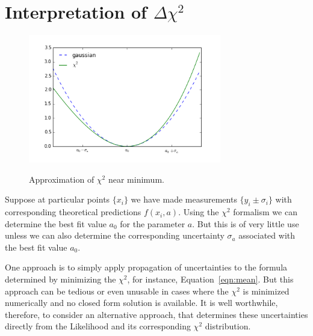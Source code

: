 \documentclass[12pt,oneside]{book}
\begin{document}
\section{Interpretation of $\Delta \chi^2$}

\begin{figure}[htbp]
\begin{center}
{\includegraphics[width=0.75\textwidth]{figs/chisq.png}}
\end{center}
\caption{\label{fig:chisq} Approximation of $\chi^2$ near minimum.}
\end{figure}

Suppose at particular points $\{x_i\}$ we have made measurements $\{y_i \pm \sigma_i\}$ with corresponding theoretical predictions $f(x_i, a)$.  Using the $\chi^2$ formalism we can determine the best fit value $a_0$ for the parameter $a$.  But this is of very little use unless we can also determine the corresponding uncertainty $\sigma_a$ associated with the best fit value $a_0$.  

One approach is to simply apply propagation of uncertainties to the formula determined by minimizing the $\chi^2$, for instance, Equation~\ref{eqn:mean}.  But this approach can be tedious or even unusable in cases where the $\chi^2$ is minimized numerically and no closed form solution is available.   It is well worthwhile, therefore, to consider an alternative approach, that determines these uncertainties directly from the Likelihood and its corresponding $\chi^2$ distribution.
\end{document}
